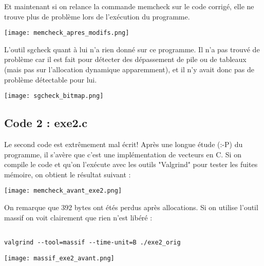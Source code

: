Et maintenant si on relance la commande memcheck sur le code corrigé, elle ne trouve plus de problème lors de l'exécution du programme.
\begin{center} 
\hspace{15cm}
\texttt{[image: memcheck\_apres\_modifs.png]}
\end{center}
\vspace{0.5cm}

L'outil sgcheck quant à lui n'a rien donné sur ce programme. Il n'a pas trouvé de problème car il est fait pour détecter des dépassement de pile ou de tableaux (mais pas sur l'allocation dynamique apparemment), et il n'y avait donc pas de problème détectable pour lui.
\begin{center} 
\hspace{15cm}
\texttt{[image: sgcheck\_bitmap.png]}
\end{center}
\vspace{0.5cm}


\pagebreak
\subsection{Code 2 : exe2.c}
Le second code est extrêmement mal écrit! Après une longue étude (:-P) du programme, il s'avère que c'est une implémentation de vecteurs en C. Si on compile le code et qu'on l'exécute avec les outils "Valgrind" pour tester les fuites mémoire, on obtient le résultat suivant :
\begin{center} 
\hspace{15cm}
\texttt{[image: memcheck\_avant\_exe2.png]}
\end{center}
\vspace{0.5cm}

On remarque que 392 bytes ont étés perdus après allocations. Si on utilise l'outil massif on voit clairement que rien n'est libéré :
\begin{lstlisting}[frame=single,style=Console]  % Start your code-block

valgrind --tool=massif --time-unit=B ./exe2_orig
\end{lstlisting}
\begin{center} 
\hspace{15cm}
\texttt{[image: massif\_exe2\_avant.png]}
\end{center}
\vspace{0.5cm}
\pagebreak





